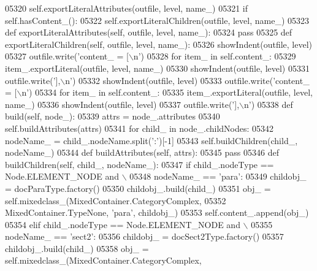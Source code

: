 \begin{DoxyCode}
{{{{{{{{{{{{{{{{{{{{{{{{{{{{{{{{{{{{{{{{{{{{{{{{{{{{{{{{{{{{{{{{{{{{{{{{{{{{{{{{{{{{{{{{{{{{{{{{{{{{{{{{{{{{{{{{{{{{{{{{{{{{{{{{{{{{{{{{{{{{{{{{{{{{{{{{{{{{{{{{{{{{{{{{{{{{{{{{{{{{{{{{{{{{{{{{{{{{{{{{{{{{{{{{{{{{{{{{{{{{{{{{{{{{{{{{{{{{{{{{{{{{{{{{{{{{{{{{{{{{{{{{{{{{{{{{{{{{{{{{{{{{{{{{{{{{{{{{{{{{{{{{{{{{{{{{{{{{{{{{{{{{{{{{{{{{{{{{{{{{05320         self.exportLiteralAttributes(outfile, level, name\_)
05321         \textcolor{keywordflow}{if} self.hasContent_():
05322             self.exportLiteralChildren(outfile, level, name\_)
05323     \textcolor{keyword}{def }exportLiteralAttributes(self, outfile, level, name\_):
05324         \textcolor{keywordflow}{pass}
05325     \textcolor{keyword}{def }exportLiteralChildren(self, outfile, level, name\_):
05326         showIndent(outfile, level)
05327         outfile.write(\textcolor{stringliteral}{'content\_ = [\(\backslash\)n'})
05328         \textcolor{keywordflow}{for} item\_ \textcolor{keywordflow}{in} self.content\_:
05329             item\_.exportLiteral(outfile, level, name\_)
05330         showIndent(outfile, level)
05331         outfile.write(\textcolor{stringliteral}{'],\(\backslash\)n'})
05332         showIndent(outfile, level)
05333         outfile.write(\textcolor{stringliteral}{'content\_ = [\(\backslash\)n'})
05334         \textcolor{keywordflow}{for} item\_ \textcolor{keywordflow}{in} self.content\_:
05335             item\_.exportLiteral(outfile, level, name\_)
05336         showIndent(outfile, level)
05337         outfile.write(\textcolor{stringliteral}{'],\(\backslash\)n'})
05338     \textcolor{keyword}{def }build(self, node\_):
05339         attrs = node\_.attributes
05340         self.buildAttributes(attrs)
05341         \textcolor{keywordflow}{for} child\_ \textcolor{keywordflow}{in} node\_.childNodes:
05342             nodeName\_ = child\_.nodeName.split(\textcolor{stringliteral}{':'})[-1]
05343             self.buildChildren(child\_, nodeName\_)
05344     \textcolor{keyword}{def }buildAttributes(self, attrs):
05345         \textcolor{keywordflow}{pass}
05346     \textcolor{keyword}{def }buildChildren(self, child\_, nodeName\_):
05347         \textcolor{keywordflow}{if} child\_.nodeType == Node.ELEMENT\_NODE \textcolor{keywordflow}{and} \(\backslash\)
05348             nodeName\_ == \textcolor{stringliteral}{'para'}:
05349             childobj\_ = docParaType.factory()
05350             childobj\_.build(child\_)
05351             obj\_ = self.mixedclass\_(MixedContainer.CategoryComplex,
05352                 MixedContainer.TypeNone, \textcolor{stringliteral}{'para'}, childobj\_)
05353             self.content\_.append(obj\_)
05354         \textcolor{keywordflow}{elif} child\_.nodeType == Node.ELEMENT\_NODE \textcolor{keywordflow}{and} \(\backslash\)
05355             nodeName\_ == \textcolor{stringliteral}{'sect2'}:
05356             childobj\_ = docSect2Type.factory()
05357             childobj\_.build(child\_)
05358             obj\_ = self.mixedclass\_(MixedContainer.CategoryComplex,
}}}}}}}}}}}}}}}}}}}}}}}}}}}}}}}}}}}}}}}}}}}}}}}}}}}}}}}}}}}}}}}}}}}}}}}}}}}}}}}}}}}}}}}}}}}}}}}}}}}}}}}}}}}}}}}}}}}}}}}}}}}}}}}}}}}}}}}}}}}}}}}}}}}}}}}}}}}}}}}}}}}}}}}}}}}}}}}}}}}}}}}}}}}}}}}}}}}}}}}}}}}}}}}}}}}}}}}}}}}}}}}}}}}}}}}}}}}}}}}}}}}}}}}}}}}}}}}}}}}}}}}}}}}}}}}}}}}}}}}}}}}}}}}}}}}}}}}}}}}}}}}}}}}}}}}}}}}}}}}}}}}}}}}}}}}}}}}}}}}}
\end{DoxyCode}
